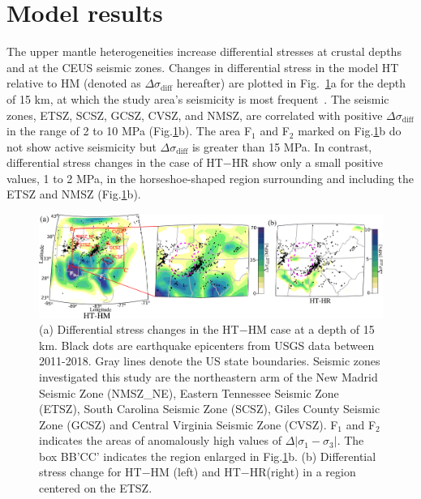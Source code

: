 \documentclass[draft,linenumbers]{agujournal2018}
\begin{document}
\section{Model results}
%
The upper mantle heterogeneities increase differential stresses at crustal depths and at the CEUS seismic zones. Changes in differential stress in the model HT relative to HM (denoted as $\Delta \sigma_{\text{diff}}$ hereafter)
are plotted in Fig.~\ref{df_model}a for the depth of 15 km, at which the study area's seismicity is most frequent~\citep[e.g.,][]{mazzotti2010state}. The seismic zones, ETSZ, SCSZ, GCSZ, CVSZ, and NMSZ, are correlated with positive $\Delta \sigma_{\text{diff}}$ in the range of 2 to 10 MPa (Fig.\ref{df_model}b). The area F$_{1}$ and F$_{2}$ marked on Fig.\ref{df_model}b do not show active seismicity but $\Delta \sigma_{\text{diff}}$ is greater than 15 MPa. In contrast, differential stress changes in the case of HT$-$HR show only a small positive values, 1 to 2 MPa, in the horseshoe-shaped region surrounding  and including the ETSZ and NMSZ (Fig.\ref{df_model}b).
%
\begin{figure}[h!]
    \centering
    \includegraphics[width=0.75\linewidth]{figures/diff_stress_model.png}
    \caption{(a) Differential stress changes in the HT$-$HM case at a depth of 15 km. Black dots are earthquake epicenters from USGS data between 2011-2018. Gray lines denote the US state boundaries. Seismic zones investigated this study are the northeastern arm of the New Madrid Seismic Zone (NMSZ\_NE), Eastern Tennessee Seismic Zone (ETSZ), South Carolina Seismic Zone (SCSZ), Giles County Seismic Zone (GCSZ) and Central Virginia Seismic Zone (CVSZ). F$_1$ and F$_2$ indicates the areas of anomalously high values of $\Delta|\sigma_1 - \sigma_3|$. The box BB'CC' indicates the region enlarged in Fig.\ref{df_model}b. (b) Differential stress change for HT$-$HM (left) and HT$-$HR(right) in a region centered on the ETSZ.}
    \label{df_model}
\end{figure}
\end{document}
